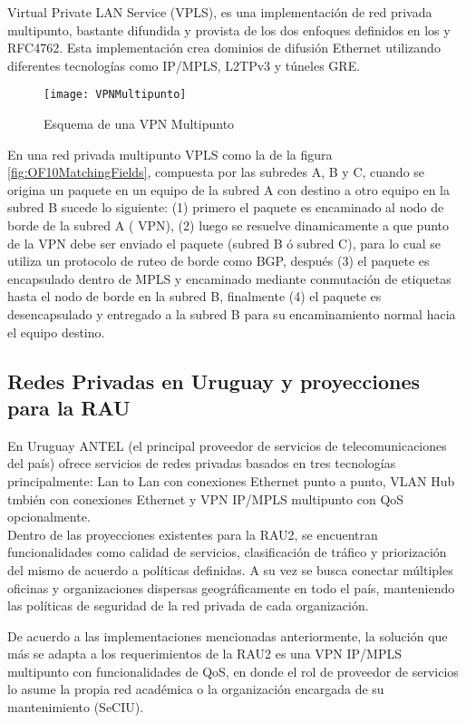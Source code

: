 Virtual Private LAN Service (VPLS), es una implementaci\'on de red privada multipunto, bastante difundida y provista de los dos enfoques definidos en los \citep{kompella2007virtual} y RFC4762\cite{lasserre2007virtual}. Esta implementaci\'on crea dominios de difusión Ethernet utilizando diferentes tecnologías como IP/MPLS, L2TPv3 y túneles GRE.

\begin{figure}[htbp!] 
\centering    
\texttt{[image: VPNMultipunto]}
\caption[Esquema de una VPN Multipunto]{Esquema de una VPN Multipunto}
\label{fig:VPNMulipunto}
\end{figure}
 
En una red privada multipunto VPLS como la de la figura \ref{fig:OF10MatchingFields}, compuesta por las subredes A, B y C, cuando se origina un paquete en un equipo de la subred A con destino a otro equipo en la subred B sucede lo siguiente: (1) primero el paquete es encaminado al nodo de borde de la subred A ( VPN), (2) luego se resuelve dinamicamente a que punto de la VPN debe ser enviado el paquete (subred B \'o subred C), para lo cual se utiliza un protocolo de ruteo de borde como BGP, despu\'es (3) el paquete es encapsulado dentro de MPLS y encaminado mediante conmutaci\'on de etiquetas hasta el nodo de borde en la subred B, finalmente (4) el paquete es desencapsulado y entregado a la subred B para su encaminamiento normal hacia el equipo destino.

\subsection{Redes Privadas en Uruguay y proyecciones para la RAU}
En Uruguay ANTEL (el principal proveedor de servicios de telecomunicaciones del país) ofrece servicios de redes privadas basados en tres tecnolog\'ias principalmente: Lan to Lan con conexiones Ethernet punto a punto, VLAN Hub tmbi\'en con conexiones Ethernet y VPN IP/MPLS multipunto con QoS opcionalmente.\\

Dentro de las proyecciones existentes para la RAU2, se encuentran funcionalidades como calidad de servicios, clasificaci\'on de tr\'afico y priorizaci\'on del mismo de acuerdo a pol\'iticas definidas. A su vez se busca conectar m\'ultiples oficinas y organizaciones dispersas geogr\'aficamente en todo el país, manteniendo las pol\'iticas de seguridad de la red privada de cada organizaci\'on. 

De acuerdo a las implementaciones mencionadas anteriormente, la soluci\'on que m\'as se adapta a los requerimientos de la RAU2 es una VPN IP/MPLS multipunto con funcionalidades de QoS, en donde el rol de proveedor de servicios lo asume la propia red académica o la organizaci\'on encargada de su mantenimiento (SeCIU).\\ 


